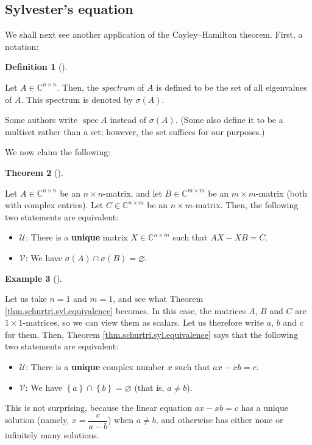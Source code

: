 \documentclass[numbers=enddot,12pt,final,onecolumn,notitlepage]{scrartcl}%
\numberwithin{exer}{subsection}
\theoremstyle{definition}
\newtheorem{theo}{Theorem}[subsection]
\newenvironment{theorem}[1][]
{\begin{theo}[#1]\begin{leftbar}}
{\end{leftbar}\end{theo}}
\newtheorem{defi}[theo]{Definition}
\newenvironment{definition}[1][]
{\begin{defi}[#1]\begin{leftbar}}
{\end{leftbar}\end{defi}}
\newtheorem{exam}[theo]{Example}
\newenvironment{example}[1][]
{\begin{exam}[#1]\begin{leftbar}}
{\end{leftbar}\end{exam}}
\begin{document}
\subsection{Sylvester's equation}

We shall next see another application of the Cayley--Hamilton theorem. First,
a notation:

\begin{definition}
\label{def.schurtri.syl.spec}Let $A\in\mathbb{C}^{n\times n}$. Then, the
\emph{spectrum} of $A$ is defined to be the set of all eigenvalues of $A$.
This spectrum is denoted by $\sigma\left(  A\right)  $.
\end{definition}

Some authors write $\operatorname*{spec}A$ instead of $\sigma\left(  A\right)
$. (Some also define it to be a multiset rather than a set; however, the set
suffices for our purposes.)

We now claim the following:

\begin{theorem}
\label{thm.schurtri.syl.equivalence}Let $A\in\mathbb{C}^{n\times n}$ be an
$n\times n$-matrix, and let $B\in\mathbb{C}^{m\times m}$ be an $m\times
m$-matrix (both with complex entries). Let $C\in\mathbb{C}^{n\times m}$ be an
$n\times m$-matrix. Then, the following two statements are equivalent:

\begin{itemize}
\item $\mathcal{U}$: There is a \textbf{unique} matrix $X\in\mathbb{C}%
^{n\times m}$ such that $AX-XB=C$.

\item $\mathcal{V}$: We have $\sigma\left(  A\right)  \cap\sigma\left(
B\right)  =\varnothing$.
\end{itemize}
\end{theorem}

\begin{example}
Let us take $n=1$ and $m=1$, and see what Theorem
\ref{thm.schurtri.syl.equivalence} becomes. In this case, the matrices $A$,
$B$ and $C$ are $1\times1$-matrices, so we can view them as scalars. Let us
therefore write $a$, $b$ and $c$ for them. Then, Theorem
\ref{thm.schurtri.syl.equivalence} says that the following two statements are equivalent:

\begin{itemize}
\item $\mathcal{U}$: There is a \textbf{unique} complex number $x$ such that
$ax-xb=c$.

\item $\mathcal{V}$: We have $\left\{  a\right\}  \cap\left\{  b\right\}
=\varnothing$ (that is, $a\neq b$).
\end{itemize}

This is not surprising, because the linear equation $ax-xb=c$ has a unique
solution (namely, $x=\dfrac{c}{a-b}$) when $a\neq b$, and otherwise has either
none or infinitely many solutions.
\end{example}
\end{document}

